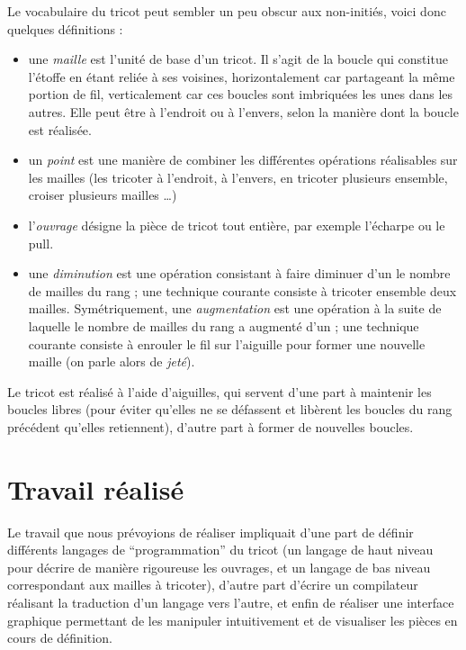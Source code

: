 \documentclass{article}
\begin{document}
Le vocabulaire du tricot peut sembler un peu obscur aux non-initiés, voici donc quelques définitions :

\begin{itemize}
\item une \emph{maille} est l'unité de base d'un tricot. Il s'agit de la boucle qui constitue l'étoffe en étant reliée à ses voisines, horizontalement car 
  partageant la même portion de fil, verticalement car ces boucles sont imbriquées les unes dans les autres. Elle peut être à l'endroit ou à l'envers, selon la 
  manière dont la boucle est réalisée.
\item un \emph{point} est une manière de combiner les différentes opérations réalisables sur les mailles (les tricoter à l'endroit, à l'envers, en tricoter 
  plusieurs ensemble, croiser plusieurs mailles \dots)
\item l'\emph{ouvrage} désigne la pièce de tricot tout entière, par exemple l'écharpe ou le pull.
\item une \emph{diminution} est une opération consistant à faire diminuer d'un le nombre de mailles du rang ; une technique courante consiste à tricoter ensemble 
  deux mailles. Symétriquement, une \emph{augmentation} est une opération à la suite de laquelle le nombre de mailles du rang a augmenté d'un ; une technique 
  courante consiste à enrouler le fil sur l'aiguille pour former une nouvelle maille (on parle alors de \emph{jeté}).
\end{itemize}

Le tricot est réalisé à l'aide d'aiguilles, qui servent d'une part à maintenir les boucles libres (pour éviter qu'elles ne se défassent et libèrent les boucles du 
rang précédent qu'elles retiennent), d'autre part à former de nouvelles boucles.

\newpage

\section{Travail réalisé}

Le travail que nous prévoyions de réaliser impliquait d'une part de définir différents langages de ``programmation'' du tricot (un langage de haut niveau pour 
décrire de manière rigoureuse les ouvrages, et un langage de bas niveau correspondant aux mailles à tricoter), d'autre part d'écrire un compilateur réalisant la 
traduction d'un langage vers l'autre, et enfin de réaliser une interface graphique permettant de les manipuler intuitivement et de visualiser les pièces en cours de 
définition.
\end{document}
